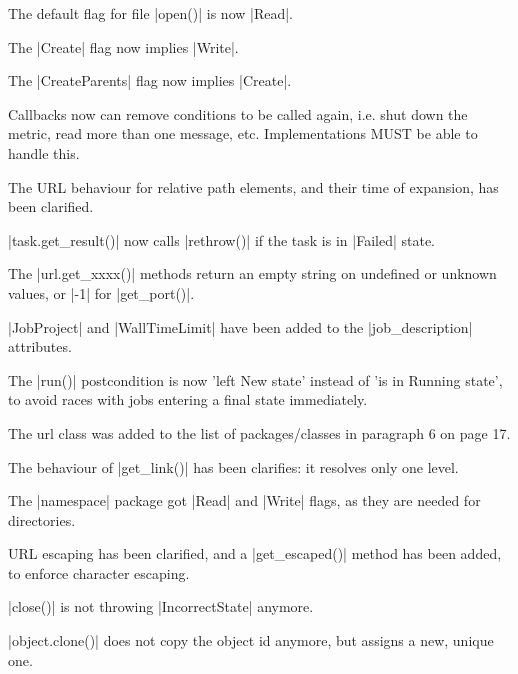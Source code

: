 \begin{shortlist}
  \item The default flag for file |open()| is now |Read|.

  \item The |Create| flag now implies |Write|.

  \item The |CreateParents| flag now implies |Create|.

  \item Callbacks now can remove conditions to be called again, i.e.
  shut down the metric, read more than one message, etc.
  Implementations MUST be able to handle this.

  \item The  URL behaviour for relative path elements, and their time
  of expansion, has been clarified.

  \item |task.get_result()| now calls |rethrow()| if the task is in
  |Failed| state.

  \item The |url.get_xxxx()| methods return an empty string on
  undefined or unknown values, or |-1| for |get_port()|.
  
  \item |JobProject| and |WallTimeLimit| have been added to the
  |job_description| attributes.
  
  \item The |run()| postcondition is now 'left New state' instead of
  'is in Running state', to avoid races with jobs entering a final
  state immediately.
  
  \item The url class was added to the list of \LF packages/classes in
  paragraph 6 on page 17.
  
  \item The behaviour of |get_link()| has been clarifies: it resolves
  only one level.
  
  \item The |namespace| package got |Read| and |Write| flags, as they
  are needed for directories.
  
  \item URL escaping has been clarified, and a |get_escaped()|
  method has been added, to enforce character escaping.
  
  \item |close()| is not throwing |IncorrectState| anymore.
  
  \item |object.clone()| does not copy the object id anymore, but
  assigns a new, unique one.
  

\end{shortlist}

